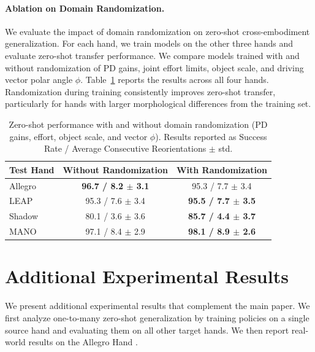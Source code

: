 \paragraph{Ablation on Domain Randomization.}
We evaluate the impact of domain randomization on zero-shot cross-embodiment generalization. For each hand, we train models on the other three hands and evaluate zero-shot transfer performance. We compare models trained with and without randomization of PD gains, joint effort limits, object scale, and driving vector polar angle $\phi$. Table~\ref{tab:randomization_ablation} reports the results across all four hands. Randomization during training consistently improves zero-shot transfer, particularly for hands with larger morphological differences from the training set.

\begin{table}[h]
\centering
\caption{Zero-shot performance with and without domain randomization (PD gains, effort, object scale, and vector $\phi$). Results reported as Success Rate / Average Consecutive Reorientations $\pm$ std.}
\label{tab:randomization_ablation}
\vspace{-2mm}
\setlength{\tabcolsep}{4pt}
\begin{tabular}{lcc}
\toprule
\textbf{Test Hand} & \textbf{Without Randomization} & \textbf{With Randomization} \\
\midrule
Allegro & \textbf{96.7 / 8.2 $\pm$ 3.1} & 95.3 / 7.7 $\pm$ 3.4 \\
LEAP    & 95.3 / 7.6 $\pm$ 3.4 & \textbf{95.5 / 7.7 $\pm$ 3.5} \\
Shadow  & 80.1 / 3.6 $\pm$ 3.6 & \textbf{85.7 / 4.4 $\pm$ 3.7} \\
MANO    & 97.1 / 8.4 $\pm$ 2.9 & \textbf{98.1 / 8.9 $\pm$ 2.6} \\
\bottomrule
\end{tabular}
\vspace{-2mm}
\end{table}

\section{Additional Experimental Results}
\label{appendix:results}

We present additional experimental results that complement the main paper. We first analyze one-to-many zero-shot generalization by training policies on a single source hand and evaluating them on all other target hands. We then report real-world results on the Allegro Hand \cite{allegrohand}.

